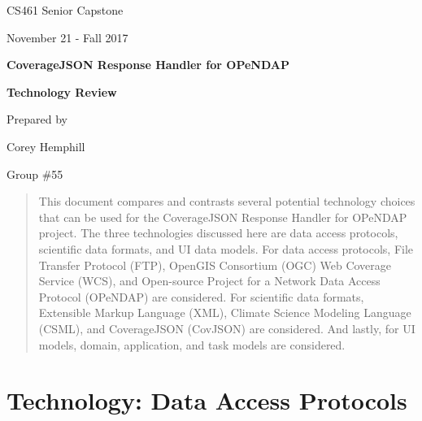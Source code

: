 \documentclass[onecolumn, draftclsnofoot,10pt, compsoc]{IEEEtran}
\def \CapstoneProjectName{CoverageJSON Response Handler for OPeNDAP}
\def \DocumentName{Technology Review}
\begin{document}
\begin{titlepage}
    \begin{singlespace}
        \hfill    
        \par\vspace{.2in}
        \centering
        \scshape{
            \huge CS461 Senior Capstone \par
            {\large November 21 - Fall 2017}\par
            \vspace{.5in}
            \textbf{\Huge\CapstoneProjectName}\par
                        \vspace{.5in}
            \textbf{\Huge\DocumentName}\par
                        \vspace{.5in}
			{\large Prepared by }\par
            {\large Corey Hemphill }\par
            {\large Group \#55 }\par
            \par\vspace{1.0in}
        }
        \begin{abstract}
        \centering
        \noindent This document compares and contrasts several potential technology choices that can be used for the CoverageJSON Response Handler for OPeNDAP project. The three technologies discussed here are data access protocols, scientific data formats, and UI data models. For data access protocols, File Transfer Protocol (FTP), OpenGIS Consortium (OGC) Web Coverage Service (WCS), and Open-source Project for a Network Data Access Protocol (OPeNDAP) are considered. For scientific data formats, Extensible Markup Language (XML), Climate Science Modeling Language (CSML), and CoverageJSON (CovJSON) are considered. And lastly, for UI models, domain, application, and task models are considered.
        \end{abstract}
    \end{singlespace}
\end{titlepage}
\newpage
{}
\clearpage


    

\section{Technology: Data Access Protocols}
\end{document}
